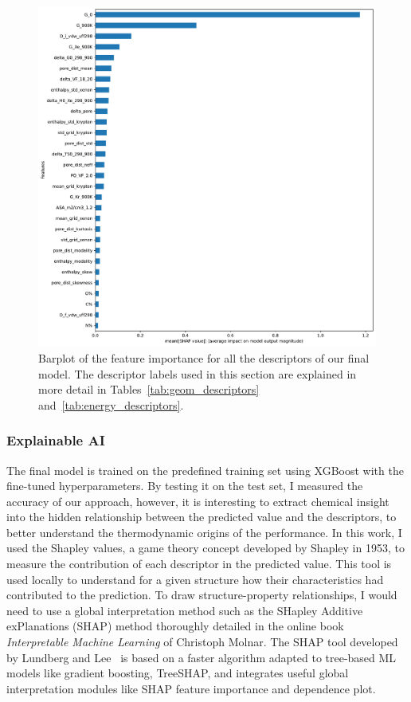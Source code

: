 \documentclass[main]{subfiles}
\begin{document}
\begin{figure}[ht]
  \centering
    \includegraphics[width=0.70\linewidth]{figures/4-ml/SI_figure/Feature_importance_shapbased.pdf}
    \caption{Barplot of the feature importance for all the descriptors of our final model. The descriptor labels used in this section are explained in more detail in Tables~\ref{tab:geom_descriptors} and~\ref{tab:energy_descriptors}.}\label{fgr:featimp_shap}
  \end{figure}

\subsubsection{Explainable AI}

The final model is trained on the predefined training set using XGBoost with the fine-tuned hyperparameters. By testing it on the test set, I measured the accuracy of our approach, however, it is interesting to extract chemical insight into the hidden relationship between the predicted value and the descriptors, to better understand the thermodynamic origins of the performance. In this work, I used the Shapley values,\autocite{shapley1953value} a game theory concept developed by Shapley in 1953, to measure the contribution of each descriptor in the predicted value. This tool is used locally to understand for a given structure how their characteristics had contributed to the prediction. To draw structure-property relationships, I would need to use a global interpretation method such as the SHapley Additive exPlanations (SHAP) method thoroughly detailed in the online book \emph{Interpretable Machine Learning} of Christoph Molnar.\autocite{molnar2020interpretable} The SHAP tool developed by Lundberg and Lee~\autocite{SHAP} is based on a faster algorithm adapted to tree-based ML models like gradient boosting, TreeSHAP, and integrates useful global interpretation modules like SHAP feature importance and dependence plot.
\end{document}
